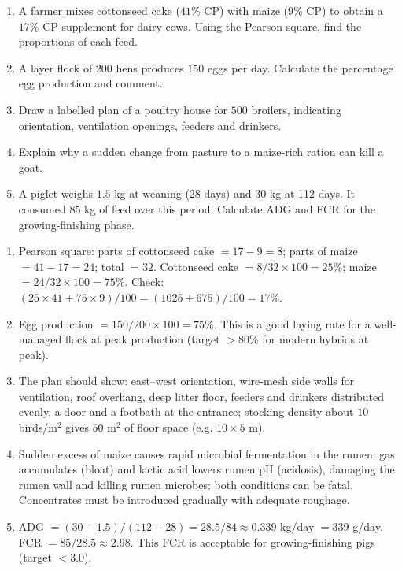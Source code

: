 \documentclass[11pt]{article}
\begin{document}
\begin{exercice}[Practice]
\begin{enumerate}
\item A farmer mixes cottonseed cake ($41\%$ CP) with maize ($9\%$ CP) to obtain a $17\%$ CP supplement for dairy cows. Using the Pearson square, find the proportions of each feed.
\item A layer flock of $200$ hens produces $150$ eggs per day. Calculate the percentage egg production and comment.
\item Draw a labelled plan of a poultry house for $500$ broilers, indicating orientation, ventilation openings, feeders and drinkers.
\item Explain why a sudden change from pasture to a maize-rich ration can kill a goat.
\item A piglet weighs $1.5$ kg at weaning (28 days) and $30$ kg at 112 days. It consumed $85$ kg of feed over this period. Calculate ADG and FCR for the growing-finishing phase.
\end{enumerate}
\end{exercice}

\begin{corrige}[Exercise 1]
\begin{enumerate}
\item Pearson square: parts of cottonseed cake $= 17 - 9 = 8$; parts of maize $= 41 - 17 = 24$; total $= 32$. Cottonseed cake $= 8/32 \times 100 = 25\%$; maize $= 24/32 \times 100 = 75\%$. Check: $(25\times 41 + 75\times 9)/100 = (1025 + 675)/100 = 17\%$.
\item Egg production $= 150/200 \times 100 = 75\%$. This is a good laying rate for a well-managed flock at peak production (target $> 80\%$ for modern hybrids at peak).
\item The plan should show: east--west orientation, wire-mesh side walls for ventilation, roof overhang, deep litter floor, feeders and drinkers distributed evenly, a door and a footbath at the entrance; stocking density about $10$ birds/m$^2$ gives $50$ m$^2$ of floor space (e.g. $10 \times 5$ m).
\item Sudden excess of maize causes rapid microbial fermentation in the rumen: gas accumulates (bloat) and lactic acid lowers rumen pH (acidosis), damaging the rumen wall and killing rumen microbes; both conditions can be fatal. Concentrates must be introduced gradually with adequate roughage.
\item ADG $= (30 - 1.5) / (112 - 28) = 28.5 / 84 \approx 0.339$ kg/day $= 339$ g/day. FCR $= 85 / 28.5 \approx 2.98$. This FCR is acceptable for growing-finishing pigs (target $< 3.0$).
\end{enumerate}
\end{corrige}
\end{document}
